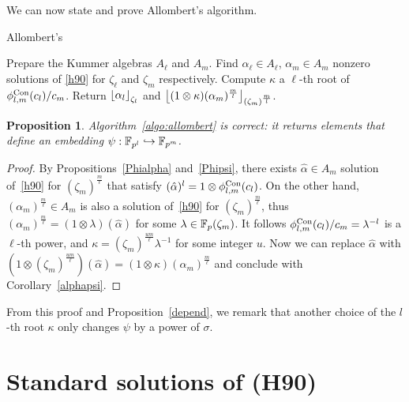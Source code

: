 \documentclass{sig-alternate}
\newtheorem{proposition}[theorem]{Proposition}
\begin{document}
We can now state and prove Allombert's algorithm.

\begin{algorithm}
  \caption{Allombert's}
  \label{algo:allombert}
  \begin{algorithmic}[1]
  \STATE Prepare the Kummer algebras $A_\ell$ and $A_m$.
  \STATE Find $\alpha_\ell\in A_\ell$, $\alpha_m\in A_m$ nonzero solutions of \eqref{h90} for $\zeta_\ell$
    and $\zeta_m$ respectively.
  \STATE Compute $\kappa$ a $\ell$-th root of ${\phi^{\textrm{Con}}_{{l},{m}}}(c_l)/c_m$.
  \STATE Return $\left\lfloor \alpha_{l} \right\rfloor_{\zeta_l}$ and $\left\lfloor (1\otimes\kappa)(\alpha_m)^{\frac{m}{l}} \right\rfloor_{(\zeta_m)^{\frac{m}{l}}}$.
  \end{algorithmic}
\end{algorithm}

\begin{proposition}
  Algorithm~\ref{algo:allombert} is correct: it returns elements that define an
  embedding $\psi:\mathbb{F}_{p^l}\hookrightarrow\mathbb{F}_{p^m}$.
\end{proposition}
\begin{proof}
By Propositions~\ref{Phialpha} and~\ref{Phipsi}, there exists $\hat{\alpha}\in A_m$
solution of~\eqref{h90} for $(\zeta_m)^{\frac{m}{\ell}}$ that satisfy $(\hat{\alpha})^l=1\otimes{\phi^{\textrm{Con}}_{{l},{m}}}(c_l)$.
On the other hand, $(\alpha_m)^{\frac{m}{\ell}}\in A_m$ is also a solution of~\eqref{h90} for $(\zeta_m)^{\frac{m}{\ell}}$,
thus $(\alpha_m)^{\frac{m}{\ell}}=(1\otimes\lambda)(\hat{\alpha})$ for some $\lambda\in\mathbb{F}_{p}(\zeta_m)$.
It follows ${\phi^{\textrm{Con}}_{{l},{m}}}(c_l)/c_m=\lambda^{-l}$ is a $\ell$-th power,
and $\kappa = (\zeta_{m})^{\frac{um}{\ell}}\lambda^{-1}$ for some integer $u$.
Now we can replace $\hat{\alpha}$
with $(1\otimes(\zeta_{m})^{\frac{um}{\ell}})(\hat{\alpha})=(1\otimes\kappa)(\alpha_m)^{\frac{m}{\ell}}$
and conclude with Corollary~\ref{alphapsi}.
\end{proof}
From this proof and Proposition~\ref{depend}, we remark that another choice of the $l$-th root $\kappa$
only changes $\psi$ by a power of $\sigma$.
    
\section{Standard solutions of (H90)}
\label{sec:compatibleH90}
\end{document}
